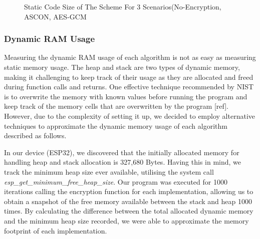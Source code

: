 \begin{figure}[H]
    \centering
    
    \resizebox{0.45\textwidth}{!}
    {
    }
    \caption{Static Code Size of The Scheme For 3 Scenarios(No-Encryption, ASCON, AES-GCM}
\label{Fig:codesize}
\end{figure}



\subsubsection*{Dynamic RAM Usage}


Measuring the dynamic RAM usage of each algorithm is not as easy as measuring static memory usage. The heap and stack are two types of dynamic memory, making it challenging to keep track of their usage as they are allocated and freed during function calls and returns. One effective technique recommended by NIST is to overwrite the memory with known values before running the program and keep track of the memory cells that are overwritten by the program [ref]. However, due to the complexity of setting it up,  we decided to employ alternative techniques to approximate the dynamic memory usage of each algorithm described as follows.



In our device (ESP32), we discovered that the initially allocated memory for handling heap and stack allocation is 327,680 Bytes. Having this in mind, we track the minimum heap size ever available, utilising the system call \textit{esp\_get\_minimum\_free\_heap\_size}. Our program was executed for 1000 iterations calling the encryption function for each implementation, allowing us to obtain a snapshot of the free memory available between the stack and heap 1000 times. By calculating the difference between the total allocated dynamic memory and the minimum heap size recorded, we were able to approximate the memory footprint of each implementation.

